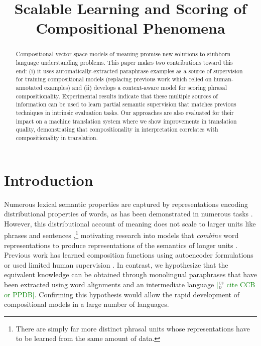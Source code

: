 \documentclass[11pt,letterpaper]{article}
\title{Scalable Learning and Scoring of Compositional Phenomena}
\date{}
\newcommand{\ensuretext}[1]{#1}
\newcommand{\clabcomment}[3]{\ensuretext{\textcolor{#3}{[#1 #2]}}}
\newcommand{\cjdmarker}{\ensuretext{\textcolor{green}{\ensuremath{^{\textsc{cj}}_{\textsc{d}}}}}}
\newcommand{\cjd}[1]{\clabcomment{\cjdmarker}{#1}{green}}
\begin{document}
\maketitle
\begin{abstract}
Compositional vector space models of meaning promise new solutions to stubborn language understanding problems. 
This paper makes two contributions toward this end: (i) it uses automatically-extracted paraphrase examples as a source of supervision for training compositional models (replacing previous work which relied on human-annotated examples) and (ii) develops a context-aware model for scoring phrasal compositionality. 
	Experimental results indicate that these multiple sources of information can be used to learn partial semantic supervision that matches previous techniques in intrinsic evaluation tasks. 
	Our approaches are also evaluated for their impact on a machine translation system where we show improvements in translation quality, demonstrating that compositionality in interpretation correlates with compositionality in translation. 
 \end{abstract}

\section{Introduction}

Numerous lexical semantic properties are captured by representations encoding distributional properties of words, as has been demonstrated in numerous tasks \cite{Turian2010,Turney2010,Mikolov2013b}.
However, this distributional account of meaning does not scale to larger units like phrases and sentences \cite[\emph{inter alia}]{Sahlgren2006,Collobert2011},\footnote{There are simply far more distinct phrasal units whose representations have to be learned from the same amount of data.} motivating research into models that \emph{combine} word representations to produce representations of the semantics of longer units \cite{Mitchell2010,Baroni2010,Socher2013}.  
Previous work has learned composition functions using autoencoder formulations \cite{Socher2013} or used limited human supervision \cite{Mitchell2010}.
In contrast, we hypothesize that the equivalent knowledge can be obtained through monolingual paraphrases that have been extracted using word alignments and an intermediate language \cjd{cite CCB or PPDB}. 
Confirming this hypothesis would allow the rapid development of compositional models in a large number of languages. 
\end{document}
